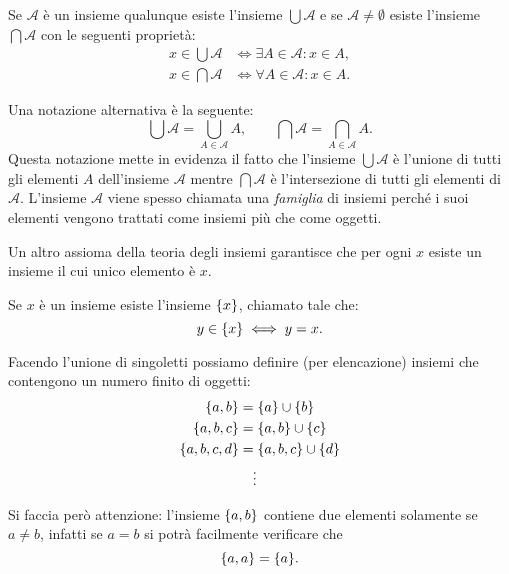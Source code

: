 \begin{axiom}
Se $\mathcal A$ è un insieme qualunque esiste l'insieme $\bigcup \mathcal A$
e se $\mathcal A \neq \emptyset$ esiste l'insieme $\bigcap \mathcal A$
con le seguenti proprietà:
\begin{align*}
  x \in \bigcup \mathcal A & \iff \exists A \in \mathcal A \colon x\in A, \\
  x \in \bigcap \mathcal A & \iff \forall A \in \mathcal A \colon x\in A.
\end{align*}
\end{axiom}
Una notazione alternativa è la seguente:
\[
 \bigcup \mathcal A = \bigcup_{A\in \mathcal A} A, \qquad 
 \bigcap \mathcal A = \bigcap_{A\in \mathcal A} A.  
\]
Questa notazione mette in evidenza il fatto che l'insieme 
$\bigcup \mathcal A$ è l'unione di tutti gli elementi $A$ dell'insieme 
$\mathcal A$ mentre $\bigcap \mathcal A$ è l'intersezione 
di tutti gli elementi di $\mathcal A$.
L'insieme $\mathcal A$ viene spesso chiamata una \emph{famiglia}
di insiemi perché i suoi elementi vengono trattati come insiemi 
più che come oggetti.

Un altro assioma della teoria degli insiemi garantisce che per ogni
$x$ esiste un insieme il cui unico elemento è $x$. 
\begin{axiom}[singoletto]
  Se $x$ è un insieme esiste l'insieme ${\left\{ x \right\}}$, 
  chiamato 
  tale che:
  \[
    y \in {\left\{ x \right\}} \iff y=x.
  \]
\end{axiom}
Facendo l'unione di singoletti possiamo definire (per elencazione) insiemi che contengono
un numero finito di oggetti:
\begin{align*}
  {\left\{ a,b \right\}} &= {\left\{ a \right\}} \cup {\left\{ b \right\}} \\
  {\left\{ a, b, c \right\}} &= {\left\{ a,b \right\}} \cup {\left\{ c \right\}}\\
  {\left\{ a, b, c, d \right\}} &= {\left\{ a,b,c \right\}} \cup {\left\{ d \right\}}\\
  &\quad\vdots
\end{align*}

Si faccia però attenzione: l'insieme ${\left\{ a,b \right\}}$ contiene due elementi
solamente se $a\neq b$, infatti se $a=b$ si potrà facilmente verificare
che
\begin{equation}\label{eq:4775523}
{\left\{ a,a \right\}} = {\left\{ a \right\}}.
\end{equation}


